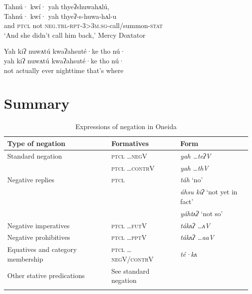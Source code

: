 \documentclass[output=paper,colorlinks,citecolor=brown]{langscibook}
\begin{document}
\ea\label{oneida:thye1}
    \glll Tahnú· kwí· yah thyeʔshuwahʌlú,  \\
    Tahnú· kwí· yah thyeʔ-s-huwa-hʌl-u  \\
    and \textsc{ptcl} not \textsc{neg.trl-rpt-3>3m.sg}-call/summon-\textsc{stat} \\
    \glt `And she didn't call him back,' Mercy Doxtator \citep[140 (5)]{MichelsonEtAl2016}
\z

\ea\label{oneida:thye2}
    {\glll Yah kiʔ nuwʌtú kwaʔahsuté·ke tho nú·  \\
    yah kiʔ nuwʌtú kwaʔahsuté·ke tho nú·  \\
    not actually ever nighttime that's where  \\}
\z

\section{Summary}

\begin{table}
\begin{tabularx}{\textwidth}{Q@{}ll}
\lsptoprule
Type of negation & Formatives & Form \\
\midrule
Standard negation & \textsc{ptcl \ldots negV} & \textit{yah \ldots teʔV} \\
& \textsc{ptcl \ldots contrV} & \textit{yah \ldots thV} \\
\tablevspace
Negative replies & \textsc{ptcl} & \textit{t\'ah} `no' \\ & & \textit{áhsu kiʔ} `not yet in fact' \\ & &  \textit{yáhtʌʔ} `not so'\\
\tablevspace
Negative imperatives &  \textsc{ptcl \ldots futV} & \textit{t\'akʌʔ  \ldots ʌV} \\
\tablevspace
Negative prohibitives & \textsc{ptcl \ldots pptV} & \textit{t\'akʌʔ  \ldots aaV} \\
\tablevspace
Equatives and category membership &   \textsc{ptcl \ldots negV/contrV}  & \textit{té·kʌ} \\
\midrule
Other stative predications & See standard negation & \\  
\lspbottomrule 
\end{tabularx}
\caption{Expressions of negation in Oneida} 
\label{oneida:tab:summary}
\end{table} 
\end{document}
